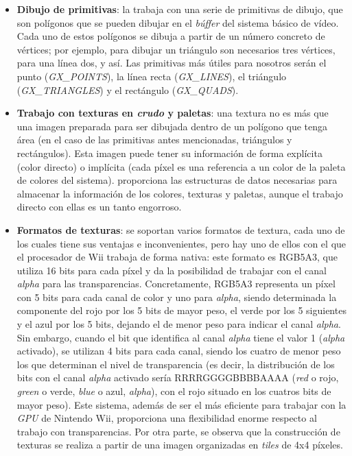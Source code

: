 \begin{itemize}
\item \textbf{Dibujo de primitivas}: la  trabaja con una serie de primitivas de dibujo, que son polígonos que se pueden dibujar en el \emph{búffer} del sistema básico de vídeo. Cada uno de estos polígonos se dibuja a partir de un número concreto de vértices; por ejemplo, para dibujar un triángulo son necesarios tres vértices, para una línea dos, y así. Las primitivas más útiles para nosotros serán el punto (\emph{GX\_POINTS}), la línea recta (\emph{GX\_LINES}), el triángulo (\emph{GX\_TRIANGLES}) y el rectángulo (\emph{GX\_QUADS}).
\item \textbf{Trabajo con texturas en \emph{crudo} y paletas}: una textura no es más que una imagen preparada para ser dibujada dentro de un polígono que tenga área (en el caso de las primitivas antes mencionadas, triángulos y rectángulos). Esta imagen puede tener su información de forma explícita (color directo) o implícita (cada píxel es una referencia a un color de la paleta de colores del sistema).  proporciona las estructuras de datos necesarias para almacenar la información de los colores, texturas y paletas, aunque el trabajo directo con ellas es un tanto engorroso.
\item \textbf{Formatos de texturas}: se soportan varios formatos de textura, cada uno de los cuales tiene sus ventajas e inconvenientes, pero hay uno de ellos con el que el procesador de Wii trabaja de forma nativa: este formato es RGB5A3, que utiliza 16 bits para cada píxel y da la posibilidad de trabajar con el canal \emph{alpha} para las transparencias. Concretamente, RGB5A3 representa un píxel con 5 bits para cada canal de color y uno para \emph{alpha}, siendo determinada la componente del rojo por los 5 bits de mayor peso, el verde por los 5 siguientes y el azul por los 5 bits, dejando el de menor peso para indicar el canal \emph{alpha}. Sin embargo, cuando el bit que identifica al canal \emph{alpha} tiene el valor 1 (\emph{alpha} activado), se utilizan 4 bits para cada canal, siendo los cuatro de menor peso los que determinan el nivel de transparencia (es decir, la distribución de los bits con el canal \emph{alpha} activado sería RRRRGGGGBBBBAAAA (\emph{red} o rojo, \emph{green} o verde, \emph{blue} o azul, \emph{alpha}), con el rojo situado en los cuatros bits de mayor peso). Este sistema, además de ser el más eficiente para trabajar con la \emph{GPU} de Nintendo Wii, proporciona una flexibilidad enorme respecto al trabajo con transparencias. Por otra parte, se observa que la construcción de texturas se realiza a partir de una imagen organizadas en \emph{tiles} de 4x4 píxeles.

\end{itemize}
